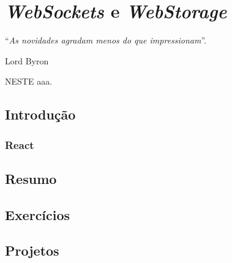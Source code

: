 \chapter{\textit{WebSockets} e \textit{WebStorage}}\label{cap:webSockesWebStorage}
\epigraph{``\textit{As novidades agradam menos do que impressionam}''.}{Lord Byron}

\lettrine[lines=4, lhang=0.1, lraise=0, loversize=0.2, findent=0.1em]{\textcolor{corTema}{N}}{ESTE} aaa.

\vfill

\section{Introdução}



\subsection{React}

\section{Resumo}

\section{Exercícios}

\section{Projetos}